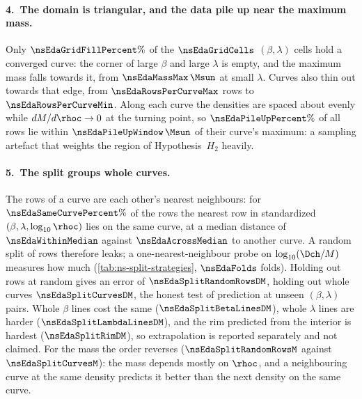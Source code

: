 \paragraph{4.\ The domain is triangular, and the data pile up near the maximum mass.}
Only $\nsEdaGridFillPercent\%$ of the $\nsEdaGridCells$ $(\beta, \lambda)$ cells hold a converged curve: the corner of large $\beta$ and large $\lambda$ is empty, and the maximum mass falls towards it, from $\nsEdaMassMax\,\Msun$ at small $\lambda$. Curves also thin out towards that edge, from $\nsEdaRowsPerCurveMax$ rows to $\nsEdaRowsPerCurveMin$. Along each curve the densities are spaced about evenly while $dM/d\rhoc \to 0$ at the turning point, so $\nsEdaPileUpPercent\%$ of all rows lie within $\nsEdaPileUpWindow\,\Msun$ of their curve's maximum: a sampling artefact that weights the region of Hypothesis~$H_2$ heavily.

\FloatBarrier

\paragraph{5.\ The split groups whole curves.}
The rows of a curve are each other's nearest neighbours: for $\nsEdaSameCurvePercent\%$ of the rows the nearest row in standardized $(\beta, \lambda, \log_{10}\rhoc)$ lies on the same curve, at a median distance of $\nsEdaWithinMedian$ against $\nsEdaAcrossMedian$ to another curve. A random split of rows therefore leaks; a one-nearest-neighbour probe on $\log_{10}(\Dch/M)$ measures how much (\cref{tab:ns-split-strategies}, $\nsEdaFolds$ folds). Holding out rows at random gives an error of $\nsEdaSplitRandomRowsDM$, holding out whole curves $\nsEdaSplitCurvesDM$, the honest test of prediction at unseen $(\beta, \lambda)$ pairs. Whole $\beta$ lines cost the same ($\nsEdaSplitBetaLinesDM$), whole $\lambda$ lines are harder ($\nsEdaSplitLambdaLinesDM$), and the rim predicted from the interior is hardest ($\nsEdaSplitRimDM$), so extrapolation is reported separately and not claimed. For the mass the order reverses ($\nsEdaSplitRandomRowsM$ against $\nsEdaSplitCurvesM$): the mass depends mostly on $\rhoc$, and a neighbouring curve at the same density predicts it better than the next density on the same curve.

